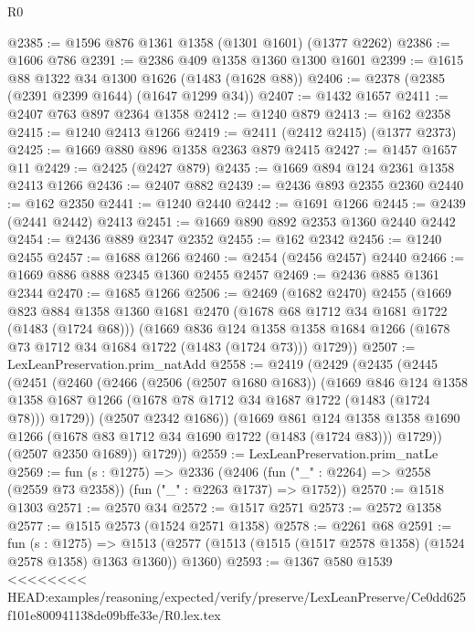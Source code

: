 \begin{lexlean}{R0}
\begin{coremodule}
{{{{{{{{{{{{{{{{{{{{{{{{{{{{{{{{{{{{{{{{{{{{{{{{{{{{{{{{{{{{{{{{{{{{{{{{{{{{{{{{{{{{{{@2385 := @1596 @876 @1361 @1358 (@1301 @1601) (@1377 @2262)
@2386 := @1606 @786
@2391 := @2386 @409 @1358 @1360 @1300 @1601
@2399 := @1615 @88 @1322 @34 @1300 @1626 (@1483 (@1628 @88))
@2406 := @2378 (@2385 (@2391 @2399 @1644) (@1647 @1299 @34))
@2407 := @1432 @1657
@2411 := @2407 @763 @897 @2364 @1358
@2412 := @1240 @879
@2413 := @162 @2358
@2415 := @1240 @2413 @1266
@2419 := @2411 (@2412 @2415) (@1377 @2373)
@2425 := @1669 @880 @896 @1358 @2363 @879 @2415
@2427 := @1457 @1657 @11
@2429 := @2425 (@2427 @879)
@2435 := @1669 @894 @124 @2361 @1358 @2413 @1266
@2436 := @2407 @882
@2439 := @2436 @893 @2355 @2360
@2440 := @162 @2350
@2441 := @1240 @2440
@2442 := @1691 @1266
@2445 := @2439 (@2441 @2442) @2413
@2451 := @1669 @890 @892 @2353 @1360 @2440 @2442
@2454 := @2436 @889 @2347 @2352
@2455 := @162 @2342
@2456 := @1240 @2455
@2457 := @1688 @1266
@2460 := @2454 (@2456 @2457) @2440
@2466 := @1669 @886 @888 @2345 @1360 @2455 @2457
@2469 := @2436 @885 @1361 @2344
@2470 := @1685 @1266
@2506 := @2469
    (@1682 @2470)
    @2455
    (@1669
      @823
      @884
      @1358
      @1360
      @1681
      @2470
      (@1678 @68 @1712 @34 @1681 @1722 (@1483 (@1724 @68)))
      (@1669
        @836
        @124
        @1358
        @1358
        @1684
        @1266
        (@1678 @73 @1712 @34 @1684 @1722 (@1483 (@1724 @73)))
        @1729))
@2507 := LexLeanPreservation.prim_natAdd
@2558 := @2419
    (@2429
      (@2435
        (@2445
          (@2451
            (@2460
              (@2466
                (@2506 (@2507 @1680 @1683))
                (@1669
                  @846
                  @124
                  @1358
                  @1358
                  @1687
                  @1266
                  (@1678 @78 @1712 @34 @1687 @1722 (@1483 (@1724 @78)))
                  @1729))
              (@2507 @2342 @1686))
            (@1669
              @861
              @124
              @1358
              @1358
              @1690
              @1266
              (@1678 @83 @1712 @34 @1690 @1722 (@1483 (@1724 @83)))
              @1729))
          (@2507 @2350 @1689))
        @1729))
@2559 := LexLeanPreservation.prim_natLe
@2569 := fun (s : @1275) =>
  @2336 (@2406 (fun ("_" : @2264) => @2558 (@2559 @73 @2358)) (fun ("_" : @2263 @1737) => @1752))
@2570 := @1518 @1303
@2571 := @2570 @34
@2572 := @1517 @2571
@2573 := @2572 @1358
@2577 := @1515 @2573 (@1524 @2571 @1358)
@2578 := @2261 @68
@2591 := fun (s : @1275) =>
  @1513 (@2577 (@1513 (@1515 (@1517 @2578 @1358) (@1524 @2578 @1358) @1363 @1360)) @1360)
@2593 := @1367 @580 @1539
<<<<<<<< HEAD:examples/reasoning/expected/verify/preserve/LexLeanPreserve/Ce0dd625f101e800941138de09bffe33e/R0.lex.tex
}}}}}}}}}}}}}}}}}}}}}}}}}}}}}}}}}}}}}}}}}}}}}}}}}}}}}}}}}}}}}}}}}}}}}}}}}}}}}}}}}}}}}}
\end{coremodule}
\end{lexlean}
